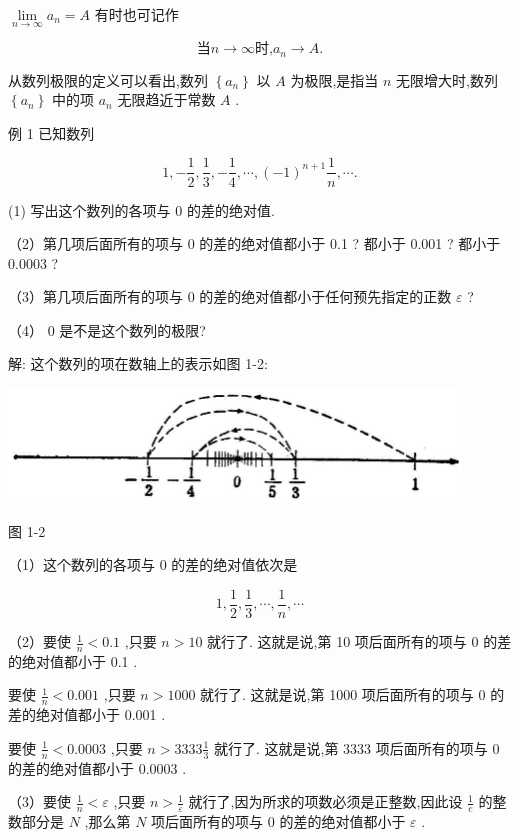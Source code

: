 \documentclass[10pt]{article}
\begin{document}
\(\mathop{\lim }\limits_{{n \rightarrow \infty }}{a}_{n} = A\) 有时也可记作

\[
\text{当}n \rightarrow \infty \text{时,}{a}_{n} \rightarrow A\text{.}
\]

从数列极限的定义可以看出,数列 \(\left\{ {a}_{n}\right\}\) 以 \(A\) 为极限,是指当 \(n\) 无限增大时,数列 \(\left\{ {a}_{n}\right\}\) 中的项 \({a}_{n}\) 无限趋近于常数 \(A\) .

例 1 已知数列

\[
1, - \frac{1}{2},\frac{1}{3}, - \frac{1}{4},\cdots ,{\left( -1\right) }^{n + 1}\frac{1}{n},\cdots \text{.}
\]

(1) 写出这个数列的各项与 0 的差的绝对值.

（2）第几项后面所有的项与 0 的差的绝对值都小于 0.1 ? 都小于 0.001 ? 都小于 0.0003 ?

（3）第几项后面所有的项与 0 的差的绝对值都小于任何预先指定的正数 \(\varepsilon\) ?

（4） 0 是不是这个数列的极限?

解: 这个数列的项在数轴上的表示如图 1-2:

\begin{center}
\includegraphics[max width=0.9\textwidth]{images/01912c18-5c3f-733d-b775-749ba9897a9d_7_608223.jpg}
\end{center}

图 1-2

（1）这个数列的各项与 0 的差的绝对值依次是

\[
1,\frac{1}{2},\frac{1}{3},\cdots ,\frac{1}{n},\cdots
\]

（2）要使 \(\frac{1}{n} < {0.1}\) ,只要 \(n > {10}\) 就行了. 这就是说,第 10 项后面所有的项与 0 的差的绝对值都小于 0.1 .

要使 \(\frac{1}{n} < {0.001}\) ,只要 \(n > {1000}\) 就行了. 这就是说,第 1000 项后面所有的项与 0 的差的绝对值都小于 0.001 .

要使 \(\frac{1}{n} < {0.0003}\) ,只要 \(n > {3333}\frac{1}{3}\) 就行了. 这就是说,第 3333 项后面所有的项与 0 的差的绝对值都小于 0.0003 .

（3）要使 \(\frac{1}{n} < \varepsilon\) ,只要 \(n > \frac{1}{\varepsilon }\) 就行了,因为所求的项数必须是正整数,因此设 \(\frac{1}{e}\) 的整数部分是 \(N\) ,那么第 \(N\) 项后面所有的项与 0 的差的绝对值都小于 \(\varepsilon\) .
\end{document}
